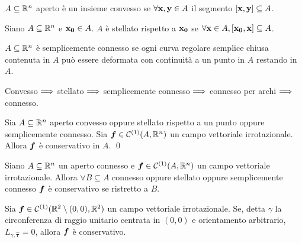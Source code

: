 \begin{definition}
	$A \subseteq \mathbb{R}^n$ aperto è un insieme convesso se $\forall \vb{x},\vb{y} \in A$ il segmento $[\vb{x},\vb{y}] \subseteq A$.
\end{definition}

\begin{definition}
	Siano $A \subseteq \mathbb{R}^n$ e $\vb{x_0} \in A$. $A$ è stellato rispetto a $\vb{x_0}$ se $\forall \vb{x} \in A, [\vb{x_0},\vb{x}]\subseteq A$.
\end{definition}

\begin{definition}
	$A \subseteq \mathbb{R}^n$ è semplicemente connesso se ogni curva regolare semplice chiusa contenuta in $A$ può essere deformata con continuità a un punto in $A$ restando in $A$.
\end{definition}

\begin{remark}
	Convesso $\Longrightarrow$ stellato $\Longrightarrow$ semplicemente connesso $\Longrightarrow$ connesso per archi $\Longrightarrow$ connesso.
\end{remark}

\begin{lemma}
	[di Poincarè]
	Sia $A \subseteq \mathbb{R}^n$ aperto convesso oppure stellato rispetto a un punto oppure semplicemente connesso. Sia $\bm f\in \mathcal{C}^{(1)}(A,\mathbb{R}^n)$ un campo vettoriale irrotazionale. Allora $\bm f$ è conservativo in $A$.
	\qed
\end{lemma}

\begin{corollary}\label{cor:loc_cons}
	Siano $A \subseteq \mathbb{R}^n$ un aperto connesso e $\bm f \in \mathcal{C}^{(1)}(A,\mathbb{R}^n)$ un campo vettoriale irrotazionale. Allora $\forall B\subseteq A$ connesso oppure stellato oppure semplicemente connesso $\bm f$ è conservativo se ristretto a $B$.
\end{corollary}

\begin{theorem}
	Sia $\bm f \in \mathcal{C}^{(1)}(\mathbb{R}^2\setminus{(0,0)}, \mathbb{R}^2)$ un campo vettoriale irrotazionale. Se, detta $\gamma$ la circonferenza di raggio unitario centrata in $(0,0)$ e orientamento arbitrario, $L_{\gamma, \hat{\bm\tau}}=0$, allora $\bm f$ è conservativo.
\end{theorem}

